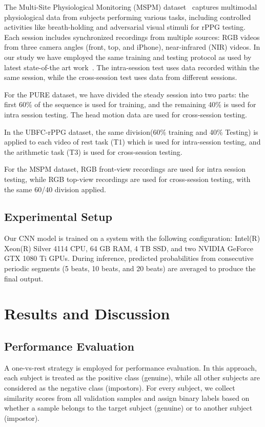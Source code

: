 The Multi-Site Physiological Monitoring (MSPM) dataset~\cite{speth2024mspm} captures multimodal physiological data from subjects performing various tasks, including controlled activities like breath-holding and adversarial visual stimuli for rPPG testing. Each session includes synchronized recordings from multiple sources: RGB videos from three camera angles (front, top, and iPhone), near-infrared (NIR) videos. 
In our study we have employed the same training and testing protocol as used by latest state-of-the art work~\cite{sun2024biometric}. The intra-session test uses data recorded within the same session, while the cross-session test uses data from different sessions. 

For the PURE dataset, we have  divided the steady session into two parts: the first 60\% of the sequence is used for training, and the remaining 40\% is used for intra session testing. The head motion data are used for cross-session testing. 

In the UBFC-rPPG dataset, the same division(60\% training and 40\% Testing) is applied to each video of rest task (T1) which is used for intra-session testing, and the arithmetic task (T3) is used for cross-session testing. 

For the MSPM dataset, RGB front-view recordings are used for intra session testing, while RGB top-view recordings are used for cross-session testing, with the same 60/40 division applied. 


\subsection{Experimental Setup }
Our CNN model is trained on a system with the following configuration: Intel(R) Xeon(R) Silver 4114 CPU, 64 GB RAM, 4 TB SSD, and two NVIDIA GeForce GTX 1080 Ti GPUs.  During inference, predicted probabilities from consecutive periodic segments (5 beats, 10 beats, and 20 beats) are averaged to produce the final output.


\section{Results and Discussion}
\subsection{Performance Evaluation}

A one-vs-rest strategy is employed for performance evaluation. In this approach, each subject is treated as the positive class (genuine), while all other subjects are considered as the negative class (impostors). For every subject, we collect similarity scores from all validation samples and assign binary labels based on whether a sample belongs to the target subject (genuine) or to another subject (impostor).

